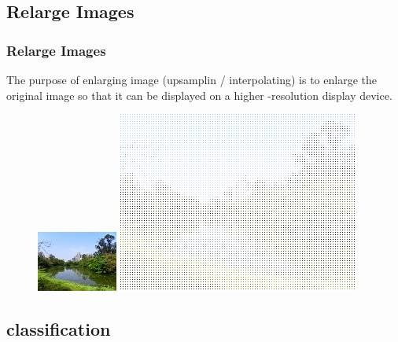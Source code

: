 \documentclass[notheorems,serif,table,compress]{beamer}  %
\begin{document}
\subsection{Relarge Images}
\begin{frame}
\frametitle{Relarge Images}
    The purpose of enlarging image (upsamplin / interpolating) is to enlarge the original image so that it can be displayed on a higher -resolution display device.
	\begin{figure}
        \begin{minipage}[t]{0.4\linewidth}
        \centering
        \includegraphics[width=0.3\linewidth]{template.png} 
        \end{minipage}
        \begin{minipage}[t]{0.4\linewidth}
        \centering
        \includegraphics[width=1\linewidth]{template1.png} 
        \end{minipage}
   	\end{figure}
\end{frame}
 
\subsection{classification}
\end{document}
